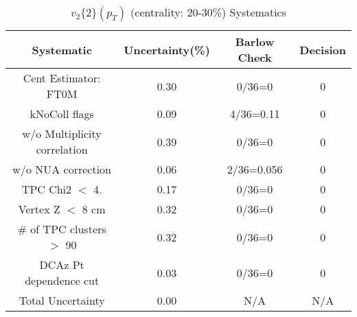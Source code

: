 \begin{table}[htbp]
\caption{$v_2\{2\}(p_{T})$ (centrality: 20-30\%) Systematics}
\label{tab:Sys_pTDiffv2}
\centering
\begin{tabular}{|c|c|c|c|}
\hline
Systematic & Uncertainty(\%) & Barlow Check & Decision \\
\hline
Cent Estimator: FT0M & 0.30 & 0/36=0 & 0 \\
kNoColl flags & 0.09 & 4/36=0.11 & 0 \\
w/o Multiplicity correlation & 0.39 & 0/36=0 & 0 \\
w/o NUA correction & 0.06 & 2/36=0.056 & 0 \\
TPC Chi2 $<$ 4. & 0.17 & 0/36=0 & 0 \\
Vertex Z $<$ 8 cm & 0.32 & 0/36=0 & 0 \\
\# of TPC clusters $>$ 90 & 0.32 & 0/36=0 & 0 \\
DCAz Pt dependence cut & 0.03 & 0/36=0 & 0 \\
\hline
Total Uncertainty & 0.00 & N/A & N/A \\
\hline
\end{tabular}
\end{table}
